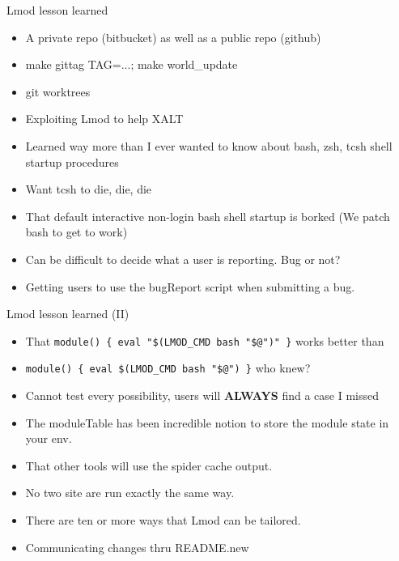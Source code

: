 \documentclass{beamer}
\begin{document}
\begin{frame}{Lmod lesson learned}
  \begin{itemize}
    \item A private repo (bitbucket) as well as a public repo (github)
    \item make gittag TAG=...; make world\_update
    \item git worktrees
    \item Exploiting Lmod to help XALT
    \item Learned way more than I ever wanted to know about bash, zsh,
      tcsh shell startup procedures
    \item Want tcsh to die, die, die
    \item That default interactive non-login bash shell startup is
      borked (We patch bash to get to work)
    \item Can be difficult to decide what a user is reporting.  Bug or
      not?
    \item Getting users to use the bugReport script when submitting a
      bug.
  \end{itemize}
\end{frame}

\begin{frame}{Lmod lesson learned (II)}
  \begin{itemize}
    \item That \texttt{module() \{ eval "\$(LMOD\_CMD bash "\$@")" \}}
        works better than
      \item \texttt{module() \{ eval \$(LMOD\_CMD bash "\$@") \}} who
        knew?
      \item Cannot test every possibility, users will \textbf{ALWAYS}
        find a case I missed
      \item The moduleTable has been incredible notion to store
        the module state in your env.
      \item That other tools will use the spider cache output.
      \item No two site are run exactly the same way.
      \item There are ten or more ways that Lmod can be tailored.
      \item Communicating changes thru README.new
  \end{itemize}
\end{frame}
\end{document}
